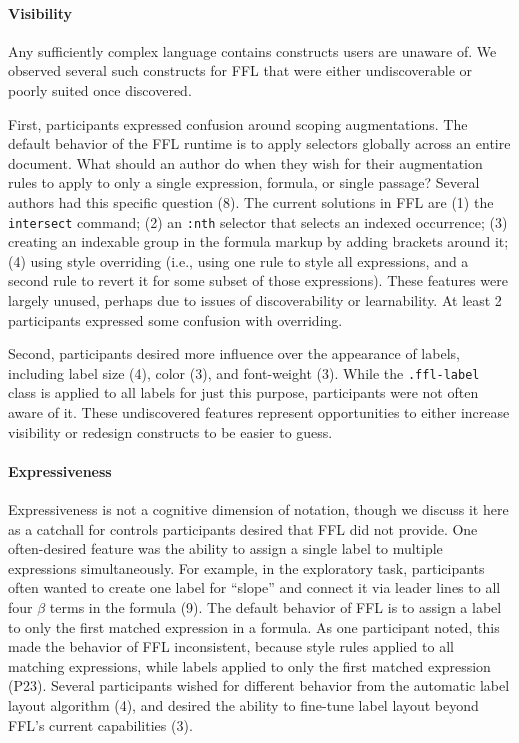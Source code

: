 \paragraph{Visibility}
Any sufficiently complex language contains constructs users are unaware of. We observed several such constructs for FFL that were either undiscoverable or poorly suited once discovered.

First, participants expressed confusion around scoping augmentations. The default behavior of the FFL runtime is to apply selectors globally across an entire document. What should an author do when they wish for their augmentation rules to apply to only a single expression, formula, or single passage? Several authors had this specific question (8). The current solutions in FFL are (1) the \texttt{intersect} command; (2) an \texttt{:nth} selector that selects an indexed occurrence; (3) creating an indexable group in the formula markup by adding brackets around it; (4) using style overriding (i.e., using one rule to style all expressions, and a second rule to revert it for some subset of those expressions). These features were largely unused, perhaps due to issues of discoverability or learnability. At least 2 participants expressed some confusion with overriding.

Second, participants desired more influence over the appearance of labels, including label size (4), color (3), and font-weight (3). While the \texttt{.ffl-label} class is applied to all labels for just this purpose, participants were not often aware of it. These undiscovered features represent opportunities to either increase visibility or redesign constructs to be easier to guess.

\paragraph{Expressiveness}
Expressiveness is not a cognitive dimension of notation, though we discuss it here as a catchall for controls participants desired that FFL did not provide. One often-desired feature was the ability to assign a single label to multiple expressions simultaneously. For example, in the exploratory task, participants often wanted to create one label for ``slope'' and connect it via leader lines to all four $\beta$ terms in the formula (9). The default behavior of FFL is to assign a label to only the first matched expression in a formula. As one participant noted, this made the behavior of FFL inconsistent, because style rules applied to all matching expressions, while labels applied to only the first matched expression (P23). Several participants wished for different behavior from the automatic label layout algorithm (4), and desired the ability to fine-tune label layout beyond FFL's current capabilities (3).
